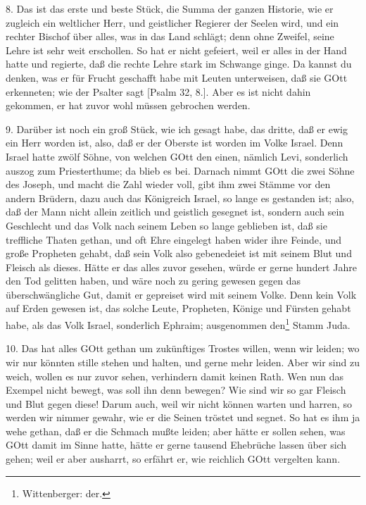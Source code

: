 8. Das ist das erste und beste Stück, die Summa der ganzen Historie, wie er zugleich ein weltlicher Herr, und geistlicher Regierer der Seelen wird, und ein rechter Bischof über alles, was in das Land schlägt; denn ohne Zweifel, seine Lehre ist sehr weit erschollen. So hat er nicht gefeiert, weil er alles in der Hand hatte und regierte, daß die rechte Lehre stark im Schwange ginge. Da kannst du denken, was er für Frucht geschafft habe mit Leuten unterweisen, daß sie GOtt erkenneten; wie der Psalter sagt [Psalm 32, 8.]. Aber es ist nicht dahin gekommen, er hat zuvor wohl müssen gebrochen werden.

9. Darüber ist noch ein groß Stück, wie ich gesagt habe, das dritte, daß er ewig ein Herr worden ist, also, daß er der Oberste ist worden im Volke Israel. Denn Israel hatte zwölf Söhne, von welchen GOtt den einen, nämlich Levi, sonderlich auszog zum Priesterthume; da blieb es bei. Darnach nimmt GOtt die zwei Söhne des Joseph, und macht die Zahl wieder voll, gibt ihm zwei Stämme vor den andern Brüdern, dazu auch das Königreich Israel, so lange es gestanden ist; also, daß der Mann nicht allein zeitlich und geistlich gesegnet ist, sondern auch sein Geschlecht und das Volk nach seinem Leben so lange geblieben ist, daß sie treffliche Thaten gethan, und oft Ehre eingelegt haben wider ihre Feinde, und große Propheten gehabt, daß sein Volk also gebenedeiet ist mit seinem Blut und Fleisch als dieses. Hätte er das alles zuvor gesehen, würde er gerne hundert Jahre den Tod gelitten haben, und wäre noch zu gering gewesen gegen das überschwängliche Gut, damit er gepreiset wird mit seinem Volke. Denn kein Volk auf Erden gewesen ist, das solche Leute, Propheten, Könige und Fürsten gehabt habe, als das Volk Israel, sonderlich Ephraim; ausgenommen den\footnote{Wittenberger: der.} Stamm Juda.

10. Das hat alles GOtt gethan um zukünftiges Trostes willen, wenn wir leiden; wo wir nur könnten stille stehen und halten, und gerne mehr leiden. Aber wir sind zu weich, wollen es nur zuvor sehen, verhindern damit keinen Rath. Wen nun das Exempel nicht bewegt, was soll ihn denn bewegen? Wie sind wir so gar Fleisch und Blut gegen diese! Darum auch, weil wir nicht können warten und harren, so werden wir nimmer gewahr, wie er die Seinen tröstet und segnet. So hat es ihm ja wehe gethan, daß er die Schmach mußte leiden; aber hätte er sollen sehen, was GOtt damit im Sinne hatte, hätte er gerne tausend Ehebrüche lassen über sich gehen; weil er aber ausharrt, so erfährt er, wie reichlich GOtt vergelten kann.

